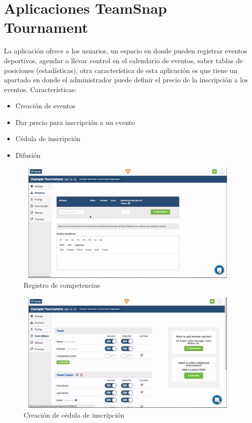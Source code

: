 	\section{Aplicaciones TeamSnap Tournament}
	La aplicación ofrece a los usuarios, un espacio en donde pueden registrar eventos deportivos, agendar o llevar control en el calendario de eventos, saber tablas de posiciones (estadísticas), otra característica de esta aplicación es que tiene un apartado en donde el administrador puede definir el precio de la inscripción a los eventos.
	Características: 
	\begin{itemize}
		\item Creación de eventos
		\item Dar precio para inscripción a un evento
		\item Cédula de inscripción
		\item Difusión
	\end{itemize}
	\begin{figure}[hbt]
		\centering
		\includegraphics[width=12cm, height=6cm]{Imagenes/Aplicaciones/TsT1.png}
		\caption{Registro de competencias}
	\end{figure}
	\pagebreak
	\begin{figure}[hbt]
		\centering
		\includegraphics[width=12cm, height=6cm]{Imagenes/Aplicaciones/TsT2.png}
		\caption{Creación de cédula de inscripción}
	\end{figure}
